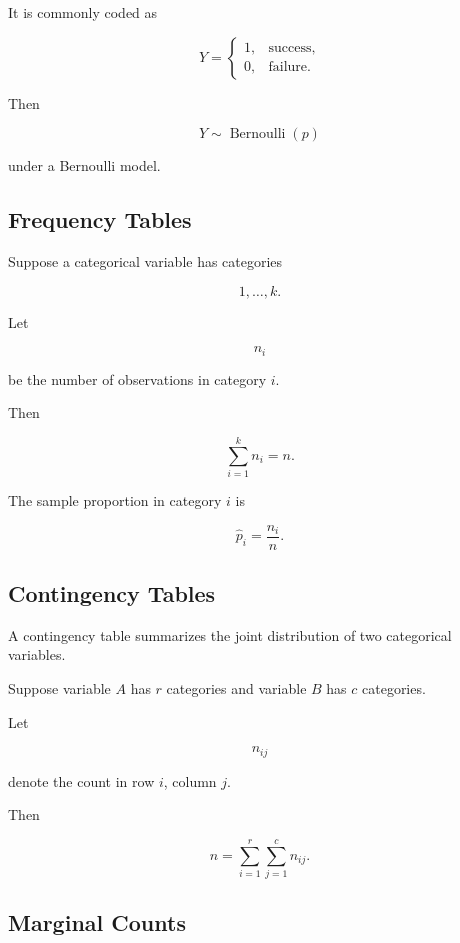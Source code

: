 It is commonly coded as

\[
\boxed{
Y
=
\begin{cases}
1,&\text{success},\\
0,&\text{failure}.
\end{cases}
}
\]

Then

\[
Y\sim\operatorname{Bernoulli}(p)
\]

under a Bernoulli model.

\subsection{Frequency Tables}
\label{subsec:categorical-frequency-tables}

Suppose a categorical variable has categories

\[
1,\ldots,k.
\]

Let

\[
n_i
\]

be the number of observations in category \(i\).

Then

\[
\boxed{
\sum_{i=1}^{k}n_i=n.
}
\]

The sample proportion in category \(i\) is

\[
\boxed{
\widehat{p}_i
=
\frac{n_i}{n}.
}
\]

\subsection{Contingency Tables}
\label{subsec:contingency-tables}

A contingency table summarizes the joint distribution of two
categorical variables.

Suppose variable \(A\) has \(r\) categories and variable \(B\) has \(c\)
categories.

Let

\[
n_{ij}
\]

denote the count in row \(i\), column \(j\).

Then

\[
\boxed{
n
=
\sum_{i=1}^{r}
\sum_{j=1}^{c}
n_{ij}.
}
\]

\subsection{Marginal Counts}
\label{subsec:marginal-counts}

